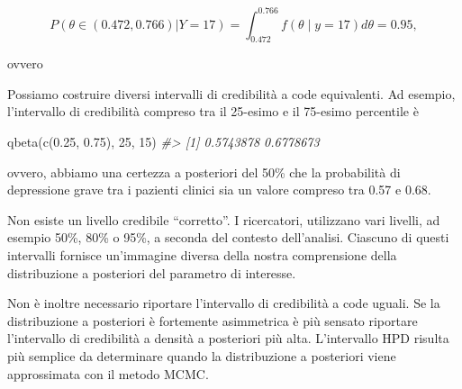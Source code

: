 \documentclass[
  11pt,
  italian,
  a4paper,
  extrafontsizes,onecolumn,openright
  ]{memoir}
\newenvironment{Shaded}{\begin{snugshade}}{\end{snugshade}}
\newcommand{\AttributeTok}[1]{\textcolor[rgb]{0.77,0.63,0.00}{#1}}
\newcommand{\CommentTok}[1]{\textcolor[rgb]{0.56,0.35,0.01}{\textit{#1}}}
\newcommand{\ControlFlowTok}[1]{\textcolor[rgb]{0.13,0.29,0.53}{\textbf{#1}}}
\newcommand{\DecValTok}[1]{\textcolor[rgb]{0.00,0.00,0.81}{#1}}
\newcommand{\FloatTok}[1]{\textcolor[rgb]{0.00,0.00,0.81}{#1}}
\newcommand{\FunctionTok}[1]{\textcolor[rgb]{0.00,0.00,0.00}{#1}}
\newcommand{\NormalTok}[1]{#1}
\newcommand{\OtherTok}[1]{\textcolor[rgb]{0.56,0.35,0.01}{#1}}
\newcommand{\SpecialCharTok}[1]{\textcolor[rgb]{0.00,0.00,0.00}{#1}}
\begin{document}
\[
P(\theta \in (0.472, 0.766) | Y = 17) = \int_{0.472}^{0.766} f(\theta \mid y=17) d\theta = 0.95,
\]

\noindent
ovvero

\begin{Shaded}
\end{Shaded}

Possiamo costruire diversi intervalli di credibilità a code equivalenti. Ad esempio, l'intervallo di credibilità compreso tra il 25-esimo e il 75-esimo percentile è

\begin{Shaded}
\begin{Highlighting}[]
\FunctionTok{qbeta}\NormalTok{(}\FunctionTok{c}\NormalTok{(}\FloatTok{0.25}\NormalTok{, }\FloatTok{0.75}\NormalTok{), }\DecValTok{25}\NormalTok{, }\DecValTok{15}\NormalTok{)}
\CommentTok{\#\textgreater{} [1] 0.5743878 0.6778673}
\end{Highlighting}
\end{Shaded}

\noindent
ovvero, abbiamo una certezza a posteriori del 50\% che la probabilità di depressione grave tra i pazienti clinici sia un valore compreso tra 0.57 e 0.68.

Non esiste un livello credibile ``corretto''. I ricercatori, utilizzano vari livelli, ad esempio 50\%, 80\% o 95\%, a seconda del contesto dell'analisi. Ciascuno di questi intervalli fornisce un'immagine diversa della nostra comprensione della distribuzione a posteriori del parametro di interesse.

Non è inoltre necessario riportare l'intervallo di credibilità a code uguali. Se la distribuzione a posteriori è fortemente asimmetrica è più sensato riportare l'intervallo di credibilità a densità a posteriori più alta.
L'intervallo HPD risulta più semplice da determinare quando la distribuzione a posteriori viene approssimata con il metodo MCMC.
\end{document}
